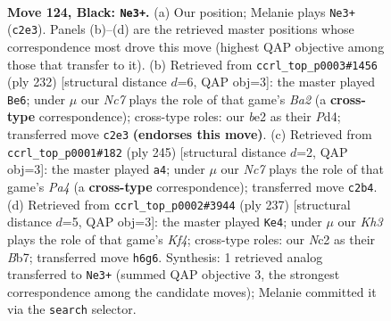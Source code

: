 \documentclass[11pt]{article}
\begin{document}
\clearpage

\begin{figure}[p]\centering
\begin{subfigure}{0.46\textwidth}\centering
\resizebox{\linewidth}{!}{%
\newchessgame
\chessboard[
  setfen={8/8/7k/6p1/8/8/2n1B1K1/8 b - - 6 124},
  showmover=false,
  pgfstyle=straightmove, color=movearrow, markmove={c2-e3}
]}
\caption{}
\end{subfigure}\hfill
\begin{subfigure}{0.46\textwidth}\centering
\resizebox{\linewidth}{!}{%
\newchessgame
\chessboard[
  setfen={8/k7/8/8/3P4/2P3b1/B1K5/8 w - - 3 117},
  showmover=false,
  pgfstyle=straightmove, color=movearrow, markmove={a2-e6}
]}
\caption{}
\end{subfigure}
\\[4pt]
\begin{subfigure}{0.46\textwidth}\centering
\resizebox{\linewidth}{!}{%
\newchessgame
\chessboard[
  setfen={8/8/7K/p7/8/k7/1p6/1B6 b - - 3 123},
  showmover=false,
  pgfstyle=straightmove, color=movearrow, markmove={a5-a4}
]}
\caption{}
\end{subfigure}\hfill
\begin{subfigure}{0.46\textwidth}\centering
\resizebox{\linewidth}{!}{%
\newchessgame
\chessboard[
  setfen={8/1b6/8/5k1p/5p1B/8/8/6K1 b - - 85 119},
  showmover=false,
  pgfstyle=straightmove, color=movearrow, markmove={f5-e4}
]}
\caption{}
\end{subfigure}
\caption{\textbf{Move 124, Black: \texttt{Ne3+}.} (a) Our position; Melanie plays \texttt{Ne3+} (\texttt{c2e3}). Panels (b)--(d) are the retrieved master positions whose correspondence most drove this move (highest QAP objective among those that transfer to it). (b) Retrieved from \texttt{ccrl\_top\_p0003\#1456} (ply 232) [structural distance $d$=6, QAP obj=3]: the master played \texttt{Be6}; under $\mu$ our \emph{Nc7} plays the role of that game's \emph{Ba2} (a \textbf{cross-type} correspondence); cross-type roles: our \emph{b}e2 as their \emph{P}d4; transferred move \texttt{c2e3} \textbf{(endorses this move)}. (c) Retrieved from \texttt{ccrl\_top\_p0001\#182} (ply 245) [structural distance $d$=2, QAP obj=3]: the master played \texttt{a4}; under $\mu$ our \emph{Nc7} plays the role of that game's \emph{Pa4} (a \textbf{cross-type} correspondence); transferred move \texttt{c2b4}. (d) Retrieved from \texttt{ccrl\_top\_p0002\#3944} (ply 237) [structural distance $d$=5, QAP obj=3]: the master played \texttt{Ke4}; under $\mu$ our \emph{Kh3} plays the role of that game's \emph{Kf4}; cross-type roles: our \emph{N}c2 as their \emph{B}b7; transferred move \texttt{h6g6}. Synthesis: 1 retrieved analog transferred to \texttt{Ne3+} (summed QAP objective 3, the strongest correspondence among the candidate moves); Melanie committed it via the \texttt{search} selector.}
\label{fig:thought-m247}
\end{figure}
\end{document}
